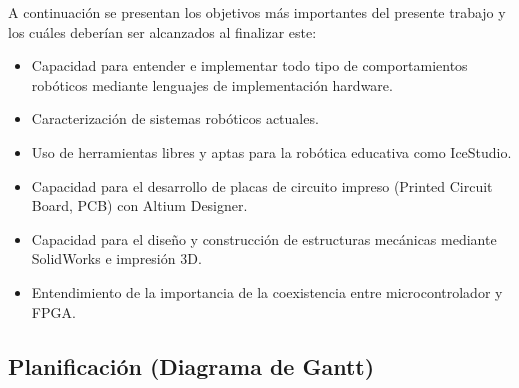 A continuación se presentan los objetivos más importantes del presente trabajo y los cuáles deberían ser alcanzados al finalizar este:
\begin{itemize}
	\item Capacidad para entender e implementar todo tipo de comportamientos robóticos mediante lenguajes de implementación hardware.
	\item Caracterización de sistemas robóticos actuales.
	\item Uso de herramientas libres y aptas para la robótica educativa como IceStudio.
	\item Capacidad para el desarrollo de placas de circuito impreso (Printed Circuit Board, PCB) con Altium Designer.
	\item Capacidad para el diseño y construcción de estructuras mecánicas mediante SolidWorks e impresión 3D.
	\item Entendimiento de la importancia de la coexistencia entre microcontrolador y FPGA.
\end{itemize}
\subsection{Planificación (Diagrama de Gantt)}

